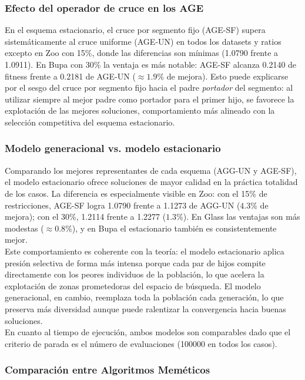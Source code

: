 \documentclass[12pt]{article}
\begin{document}
    \subsubsection{Efecto del operador de cruce en los AGE}
    
    En el esquema estacionario, el cruce por segmento fijo (AGE-SF) supera sistemáticamente al cruce uniforme (AGE-UN) en todos los datasets y ratios excepto en Zoo con 15\%, donde las diferencias son mínimas (1.0790 frente a 1.0911). En Bupa con 30\% la ventaja es más notable: AGE-SF alcanza 0.2140 de fitness frente a 0.2181 de AGE-UN ($\approx 1.9\%$ de mejora). Esto puede explicarse por el sesgo del cruce por segmento fijo hacia el padre \textit{portador} del segmento: al utilizar siempre al mejor padre como portador para el primer hijo, se favorece la explotación de las mejores soluciones, comportamiento más alineado con la selección competitiva del esquema estacionario.
    
    \subsubsection{Modelo generacional vs. modelo estacionario}
    
    Comparando los mejores representantes de cada esquema (AGG-UN y AGE-SF), el modelo estacionario ofrece soluciones de mayor calidad en la práctica totalidad de los casos. La diferencia es especialmente visible en Zoo: con el 15\% de restricciones, AGE-SF logra 1.0790 frente a 1.1273 de AGG-UN ($4.3\%$ de mejora); con el 30\%, 1.2114 frente a 1.2277 ($1.3\%$). En Glass las ventajas son más modestas ($\approx 0.8\%$), y en Bupa el estacionario también es consistentemente mejor.\\
    
    Este comportamiento es coherente con la teoría: el modelo estacionario aplica presión selectiva de forma más intensa porque cada par de hijos compite directamente con los peores individuos de la población, lo que acelera la explotación de zonas prometedoras del espacio de búsqueda. El modelo generacional, en cambio, reemplaza toda la población cada generación, lo que preserva más diversidad aunque puede ralentizar la convergencia hacia buenas soluciones.\\
    
    En cuanto al tiempo de ejecución, ambos modelos son comparables dado que el criterio de parada es el número de evaluaciones (100000 en todos los casos).
    
    \subsubsection{Comparación entre Algoritmos Meméticos}
    
\end{document}
